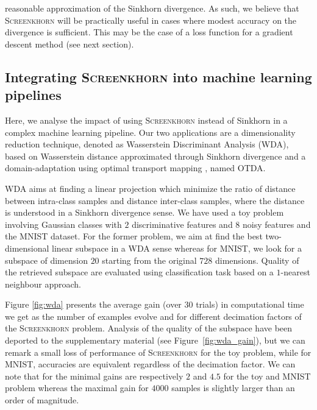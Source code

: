 reasonable approximation of the Sinkhorn divergence. As such, we believe that  \textsc{Screenkhorn} will be practically useful in cases where modest accuracy on the divergence is sufficient. This may be the case of a loss function for a gradient descent method (see next section).


\subsection{Integrating \textsc{Screenkhorn} into machine learning pipelines}

Here, we analyse the impact of using \textsc{Screenkhorn}
instead of Sinkhorn in a complex machine learning pipeline. Our two applications
are a dimensionality reduction technique, denoted as Wasserstein Discriminant Analysis (WDA), based on Wasserstein distance approximated
through Sinkhorn divergence \citep{flamary2018WDA} and a domain-adaptation using optimal transport mapping \citep{courty2017optimal}, named OTDA. 

WDA aims at finding a linear projection which minimize the ratio of distance between intra-class samples and distance inter-class samples, where the distance is understood
in a Sinkhorn divergence sense. We have used a toy problem involving Gaussian classes with $2$ discriminative features and $8$ noisy features and the MNIST dataset. For the
former problem, we aim at find the best two-dimensional linear subspace in a WDA sense whereas for MNIST, we look for a subspace of dimension $20$ starting from the original
$728$ dimensions.  Quality of the retrieved subspace are evaluated using classification task based on a $1$-nearest neighbour approach.

Figure \ref{fig:wda} presents the average gain (over $30$ trials) in computational time we get as the number of examples evolve and for different decimation factors of the \textsc{Screenkhorn} problem.
Analysis of the quality of the subspace have been deported to the supplementary material (see Figure~\ref{fig:wda_gain}), but we can remark a small loss of performance of \textsc{Screenkhorn} for the toy problem, while
for MNIST, accuracies are equivalent regardless of the decimation factor.  We can note
that for the minimal gains are respectively $2$ and $4.5$ for the toy and MNIST problem
whereas the maximal gain for $4000$ samples is slightly larger than an order of magnitude. 

